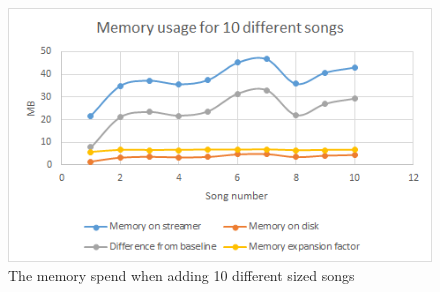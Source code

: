 \begin{figure}[H]
	\centering
	\includegraphics[scale=0.9]{gfx/memoryDiffSize}
	\caption{The memory spend when adding 10 different sized songs}
	\label{fig:memoryDiffSizes}
\end{figure}
